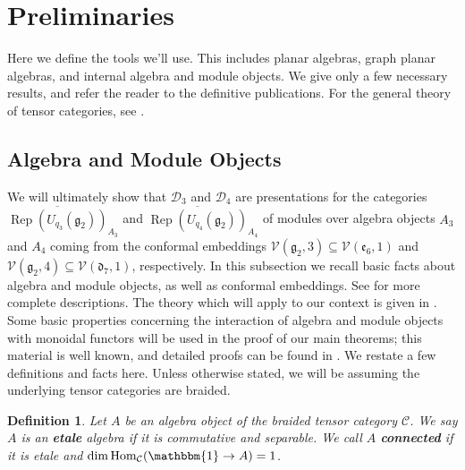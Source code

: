 \documentclass[pdflatex,sn-mathphys-num]{sn-jnl}%
\theoremstyle{thmstyleone}%
\theoremstyle{thmstyletwo}%
\theoremstyle{thmstylethree}%
\newtheorem{definition}{Definition}%
\newcommand{\unit}{\mathbbm{1}} %
\newcommand{\CC}{\mathcal{C}}
\newcommand{\DD}{\mathcal{D}}
\newcommand{\VV}{\mathcal{V}}
\newcommand{\ol}{\overline}
\newcommand{\dd}{\mathfrak{d}}
\newcommand{\ee}{\mathfrak{e}}
\renewcommand{\gg}{\mathfrak{g}}
\newcommand{\cat}[1]{\ol{\Rep(U_{#1}(\gg_2))}}
\DeclareMathOperator{\Rep}{Rep}
\DeclareMathOperator{\Hom}{Hom}
\begin{document}






\section{Preliminaries}\label{sec:prelim}
Here we define the tools we'll use. 
This includes planar algebras, graph planar algebras, and internal algebra and module objects.
We give only a few necessary results, and refer the reader to the definitive publications.
For the general theory of tensor categories, see \cite{EGNO}.



\subsection{Algebra and Module Objects}
We will ultimately show that $\DD_3$ and $\DD_4$ are presentations for the categories
$\cat{q_3}_{A_3}$ and $\cat{q_4}_{A_4}$ of modules over algebra objects $A_3$ and $A_4$ coming from the conformal embeddings 
$\VV(\gg_2,3) \subseteq \VV(\ee_6,1)$ and $\VV(\gg_2,4) \subseteq \VV(\dd_7,1)$, respectively. 
In this subsection we recall basic facts about algebra and module objects,
as well as conformal embeddings. 
See \cite{EGNO, ostrik2001modulecategoriesweakhopf} for more complete descriptions. 
The theory which will apply to our context is given in \cite{cain_noah}.
Some basic properties concerning the interaction of algebra and module objects with
monoidal functors will be used in the proof of our main theorems;
this material is well known, and detailed proofs can be found in \cite{monoidalFunctorsAndAlgebras}.
We restate a few definitions and facts here.
Unless otherwise stated, we will be assuming the underlying tensor categories are braided.


\begin{definition}
    Let $A$ be an algebra object of the braided tensor category $\CC$.
    We say $A$ is an {\bf etale} algebra if it is commutative and separable.
    We call $A$ {\bf connected} if it is etale and $\dim\Hom_\CC(\unit \to A)=1$.
\end{definition}
\end{document}

